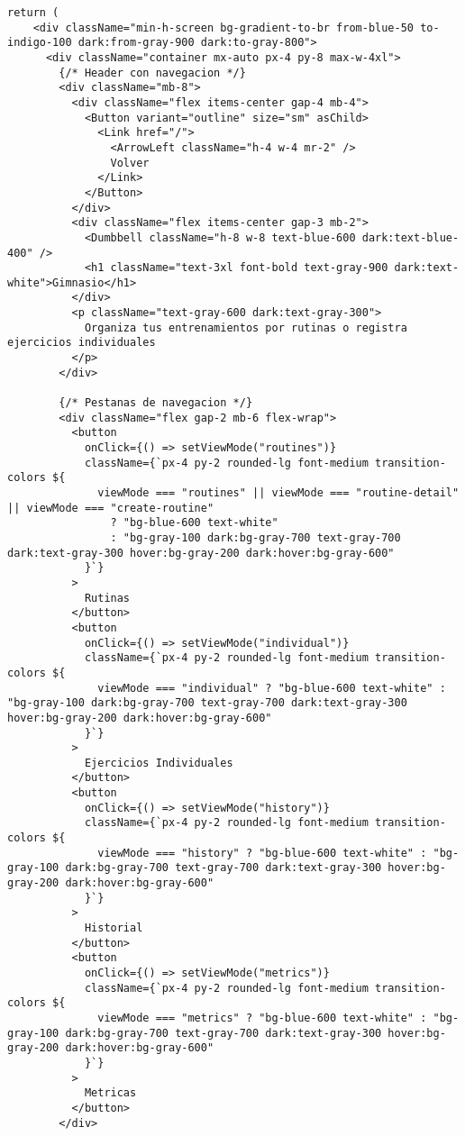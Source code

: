\documentclass[12pt,a4paper]{article}
\begin{document}
\begin{lstlisting}[caption=app/gym/page.tsx - Estructura completa]
  return (
    <div className="min-h-screen bg-gradient-to-br from-blue-50 to-indigo-100 dark:from-gray-900 dark:to-gray-800">
      <div className="container mx-auto px-4 py-8 max-w-4xl">
        {/* Header con navegacion */}
        <div className="mb-8">
          <div className="flex items-center gap-4 mb-4">
            <Button variant="outline" size="sm" asChild>
              <Link href="/">
                <ArrowLeft className="h-4 w-4 mr-2" />
                Volver
              </Link>
            </Button>
          </div>
          <div className="flex items-center gap-3 mb-2">
            <Dumbbell className="h-8 w-8 text-blue-600 dark:text-blue-400" />
            <h1 className="text-3xl font-bold text-gray-900 dark:text-white">Gimnasio</h1>
          </div>
          <p className="text-gray-600 dark:text-gray-300">
            Organiza tus entrenamientos por rutinas o registra ejercicios individuales
          </p>
        </div>

        {/* Pestanas de navegacion */}
        <div className="flex gap-2 mb-6 flex-wrap">
          <button
            onClick={() => setViewMode("routines")}
            className={`px-4 py-2 rounded-lg font-medium transition-colors ${
              viewMode === "routines" || viewMode === "routine-detail" || viewMode === "create-routine"
                ? "bg-blue-600 text-white"
                : "bg-gray-100 dark:bg-gray-700 text-gray-700 dark:text-gray-300 hover:bg-gray-200 dark:hover:bg-gray-600"
            }`}
          >
            Rutinas
          </button>
          <button
            onClick={() => setViewMode("individual")}
            className={`px-4 py-2 rounded-lg font-medium transition-colors ${
              viewMode === "individual" ? "bg-blue-600 text-white" : "bg-gray-100 dark:bg-gray-700 text-gray-700 dark:text-gray-300 hover:bg-gray-200 dark:hover:bg-gray-600"
            }`}
          >
            Ejercicios Individuales
          </button>
          <button
            onClick={() => setViewMode("history")}
            className={`px-4 py-2 rounded-lg font-medium transition-colors ${
              viewMode === "history" ? "bg-blue-600 text-white" : "bg-gray-100 dark:bg-gray-700 text-gray-700 dark:text-gray-300 hover:bg-gray-200 dark:hover:bg-gray-600"
            }`}
          >
            Historial
          </button>
          <button
            onClick={() => setViewMode("metrics")}
            className={`px-4 py-2 rounded-lg font-medium transition-colors ${
              viewMode === "metrics" ? "bg-blue-600 text-white" : "bg-gray-100 dark:bg-gray-700 text-gray-700 dark:text-gray-300 hover:bg-gray-200 dark:hover:bg-gray-600"
            }`}
          >
            Metricas
          </button>
        </div>


\end{lstlisting}
\end{document}
